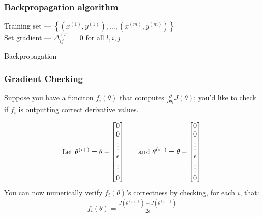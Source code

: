 \documentclass{article}
\begin{document}
\subsubsection{Backpropagation algorithm}
\begin{algorithm}
Training set --- $\left\{(x^{(1)}, y^{(1)}),\dotsc, (x^{(m)}, y^{(m)})\right\}$\\
Set gradient --- $\Delta{_{ij}^{(l)}} = 0$ for all $l, i, j$\medskip\\
\caption{Backpropagation\label{IR}}
\end{algorithm}

\subsubsection{Gradient Checking}
Suppose you have a funciton $f_{i}(\theta)$ that computes 
$\frac{\partial}{\partial\theta_{i}}J(\theta)$; you'd like to check if $f_i$ is outputting correct 
derivative values.

\begin{align*}
\text{Let } \theta^{(i+)} = \theta +
\begin{bmatrix}
0\\
0\\
\vdots\\
\epsilon\\
\vdots\\
0\\
\end{bmatrix}
\indent\text{ and } \theta^{(i-)} = \theta -
\begin{bmatrix}
0\\
0\\
\vdots\\
\epsilon\\
\vdots\\
0\\
\end{bmatrix}
\end{align*}
You can now numerically verify $f_i(\theta)$’s correctness by checking, for each
$i$, that:
\begin{align*}
f_i(\theta)=\frac{J(\theta^{(i+)})-J(\theta^{(i-)})}{2\epsilon}
\end{align*}

\newpage
\end{document}
